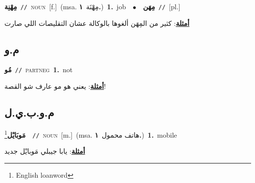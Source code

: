 \documentclass[10pt,a4paper,twoside]{article} %
\begin{document}
\begin{multicols}{2}
{\setlength\topsep{0pt}\textbf{\foreignlanguage{arabic}{مِهْنِة}}\ {\color{gray}\texttt{//}\color{black}}\ \textsc{noun}\ [f.]\ \color{gray}(msa. \foreignlanguage{arabic}{مِهْنَة}~\foreignlanguage{arabic}{\textbf{١.}})\color{black}\ \textbf{1.}~job\ \ $\bullet$\ \ \setlength\topsep{0pt}\textbf{\foreignlanguage{arabic}{مِهَن}}\ {\color{gray}\texttt{//}\color{black}}\ [pl.]\  \begin{flushright}\color{gray}\foreignlanguage{arabic}{\textbf{\underline{\foreignlanguage{arabic}{أمثلة}}}: كثير من المِهَن ألغوها بالوكالة عشان التقليصات اللي صارت}\end{flushright}\color{black}} \vspace{2mm}

\vspace{-3mm}
\subsection*{\color{blue}\foreignlanguage{arabic}{م.و}\color{blue}{}} 

{\setlength\topsep{0pt}\textbf{\foreignlanguage{arabic}{مُو}}\ {\color{gray}\texttt{//}\color{black}}\ \textsc{part\textunderscore neg}\ \textbf{1.}~not\  \begin{flushright}\color{gray}\foreignlanguage{arabic}{\textbf{\underline{\foreignlanguage{arabic}{أمثلة}}}: يعني هو مو عارف شو القصة!}\end{flushright}\color{black}} \vspace{2mm}

\vspace{-3mm}
\subsection*{\color{blue}\foreignlanguage{arabic}{م.و.ب.ي.ل}\color{blue}{ (ntws)}} 

{\setlength\topsep{0pt}\textbf{\foreignlanguage{arabic}{مَوبَايْل}}\footnote{English loanword}\ \ {\color{gray}\texttt{//}\color{black}}\ \textsc{noun}\ [m.]\ \color{gray}(msa. \foreignlanguage{arabic}{هاتف محمول}~\foreignlanguage{arabic}{\textbf{١.}})\color{black}\ \textbf{1.}~mobile\  \begin{flushright}\color{gray}\foreignlanguage{arabic}{\textbf{\underline{\foreignlanguage{arabic}{أمثلة}}}: يابا جيبلي مَوبايْل جديد}\end{flushright}\color{black}} \vspace{2mm}


\end{multicols}
\end{document}
